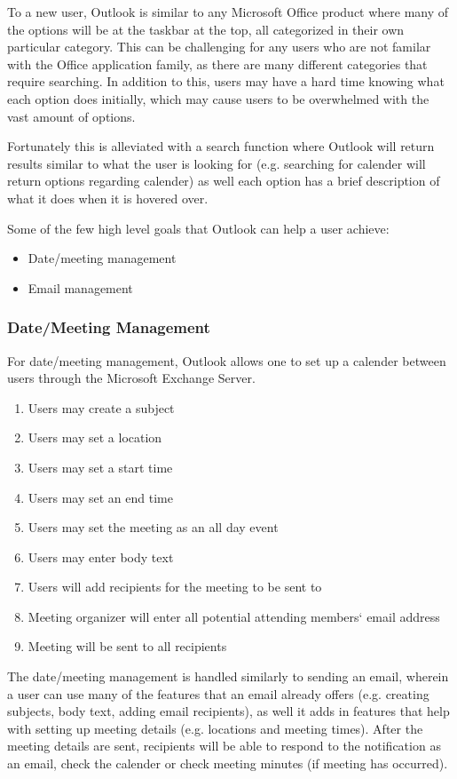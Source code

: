 \documentclass{sigchi}
\begin{document}
To a new user, Outlook is similar to any Microsoft Office product where many of the options will be at the taskbar at the top, all categorized in their own particular category. 
This can be challenging for any users who are not familar with the Office application family, as there are many different categories that require searching. 
In addition to this, users may have a hard time knowing what each option does initially, which may cause users to be overwhelmed with the vast amount of options. 

Fortunately this is alleviated with a search function where Outlook will return results similar to what the user is looking for (e.g. searching for calender will return options regarding calender) as well each option has a brief description of what it does when it is hovered over.

Some of the few high level goals that Outlook can help a user achieve:
\begin{itemize}
	\item Date/meeting management
	\item Email management
\end{itemize}

\subsubsection{Date/Meeting Management}

For date/meeting management, Outlook allows one to set up a calender between users through the Microsoft Exchange Server.
\begin{enumerate}
\item Users may create a subject
\item Users may set a location
\item Users may set a start time
\item Users may set an end time
\item Users may set the meeting as an all day event
\item Users may enter body text
\item Users will add recipients for the meeting to be sent to
\item Meeting organizer will enter all potential attending members` email address
\item Meeting will be sent to all recipients
\end{enumerate}

The date/meeting management is handled similarly to sending an email, wherein a user can use many of the features that an email already offers (e.g. creating subjects, body text, adding email recipients), as well it adds in features that help with setting up meeting details (e.g. locations and meeting times).
After the meeting details are sent, recipients will be able to respond to the notification as an email, check the calender or check meeting minutes (if meeting has occurred).
\end{document}
